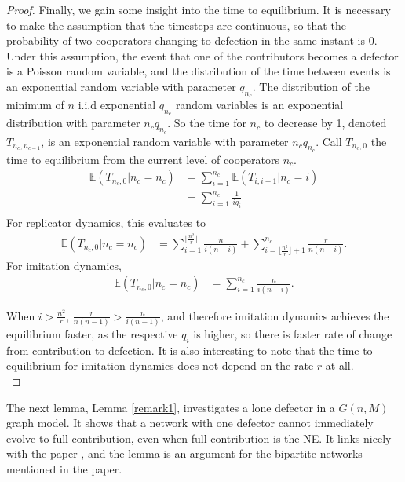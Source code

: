 \begin{proof}
Finally, we gain some insight into the time to equilibrium. It is necessary to make the assumption that the timesteps are continuous, so that the probability of two cooperators changing to defection in the same instant is 0. Under this assumption, the event that one of the contributors becomes a defector is a Poisson random variable, and the distribution of the time between events is an exponential random variable with parameter $q_{n_c}$. The distribution of the minimum of $n$ i.i.d exponential $q_{n_c}$ random variables is an exponential distribution with parameter $n_c q_{n_c}$. So the time for $n_c$ to decrease by 1, denoted $T_{{n_c},{n_{c-1}}}$, is an exponential random variable with parameter $n_c q_{n_c}$. Call $T_{n_c, 0}$ the time to equilibrium from the current level of cooperators $n_c$. 
\begin{align*}
    \mathbb E (T_{n_c, 0} | n_c = n_c) &= \sum_{i = 1}^{n_c} \mathbb E (T_{{i}, {i-1}}|n_c = i)\\
    &= \sum_{i = 1}^{n_c} \frac{1}{iq_i}\\
\end{align*}
For replicator dynamics, this evaluates to 
\begin{align*}
       \mathbb E (T_{n_c, 0} | n_c = n_c) &= \sum_{i =1}^{\lfloor \frac{n^2}{r} \rfloor} \frac{n}{i(n-i)}+ \sum_{i=\lfloor \frac{n^2}{r}\rfloor+1}^{n_c}  \frac{r}{n(n-i)}. 
\end{align*}
For imitation dynamics, 
\begin{align*}
    \mathbb E (T_{n_c, 0} | n_c = n_c) &= \sum_{i = 1}^{n_c} \frac{n}{i(n-i)}. 
\end{align*}

When $i>\frac{n^2}{r}$, $\frac{r}{n(n-1)}>\frac{n}{i(n-1)}$, and therefore imitation dynamics achieves the equilibrium faster, as the respective $q_i$ is higher, so there is faster rate of change from contribution to defection. It is also interesting to note that the time to equilibrium for imitation dynamics does not depend on the rate $r$ at all. \\

\end{proof}

 
The next lemma, Lemma \ref{remark1}, investigates a lone defector in a $G(n,M)$ graph model. It shows that a network with one defector cannot immediately evolve to full contribution, even when full contribution is the NE. It links nicely with the paper \cite{RN48}, and the lemma is an argument for the bipartite networks mentioned in the paper. \\

